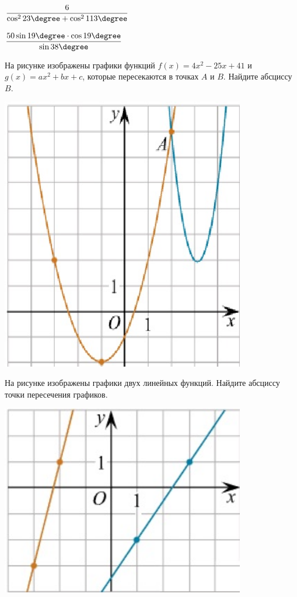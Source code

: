 \begin{listofex}
\begin{enumcols}[itemcolumns=2]
		\item \(\dfrac{6}{\cos^2{23\degree}+\cos^2{113\degree}} \)
		\item \(\dfrac{50\sin{19\degree} \cdot \cos{19\degree}}{\sin{38\degree}} \)
	\end{enumcols}
	\item \begin{minipage}[t]{0.66\textwidth}
		На рисунке изображены графики функций \( f(x)=4x^2-25x+41 \) и \( g(x)=ax^2+bx+c \), которые пересекаются в точках \(A\) и \(B\). Найдите абсциссу  \( B \).
	\end{minipage}
	\begin{minipage}[c]{0.3\textwidth}
		\includegraphics[align=b, width=0.8\textwidth]{pics/G111M3PP-1}
	\end{minipage}
	\item \begin{minipage}[t]{0.66\textwidth}
		На рисунке изображены графики двух линейных функций. Найдите абсциссу точки пересечения графиков.
	\end{minipage}
	\begin{minipage}[c]{0.3\textwidth}
		\includegraphics[align=b, width=0.8\textwidth]{pics/G111M3PP-2}
	\end{minipage}
\end{listofex}
